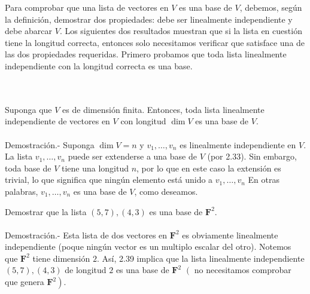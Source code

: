 Para comprobar que una lista de vectores en $V$ es una base de $V$, debemos, según la definición, demostrar dos propiedades: debe ser linealmente independiente y debe abarcar $V$. Los siguientes dos resultados muestran que si la lista en cuestión tiene la longitud correcta, entonces solo necesitamos verificar que satisface una de las dos propiedades requeridas. Primero probamos que toda lista linealmente independiente con la longitud correcta es una base.

\begin{myteo}\,\\\\
    Suponga que $V$ es de dimensión finita. Entonces, toda lista linealmente independiente de vectores en $V$ con longitud $\dim V$ es una base de $V$.\\\\
	Demostración.-\; Suponga $\dim V=n$ y $v_1,\ldots,v_n$ es linealmente independiente en $V$. La lista $v_1,\ldots,v_n$ puede ser extenderse a una base de $V$ (por 2.33). Sin embargo, toda base de $V$ tiene una longitud $n$, por lo que en este caso la extensión es trivial, lo que significa que ningún elemento está unido a $v_1,\ldots, v_n$ En otras palabras, $v_1,\ldots, v_n$ es una base de $V$, como deseamos.
\end{myteo}

\begin{myejem}
    Demostrar que la lista $(5,7),(4,3)$ es una base de $\textbf{F}^2$.\\\\
	Demostración.-\; Esta lista de dos vectores en $\textbf{F}^2$ es obviamente linealmente independiente (poque ningún vector es un multiplo escalar del otro). Notemos que $\textbf{F}^2$ tiene dimensión $2$. Así, 2.39 implica que la lista linealmente independiente $(5,7),(4,3)$ de longitud $2$ es una base de $\textbf{F}^2$ $\left(\right.$ no necesitamos comprobar que genera $\left.\textbf{F}^2\right)$. 
\end{myejem}

